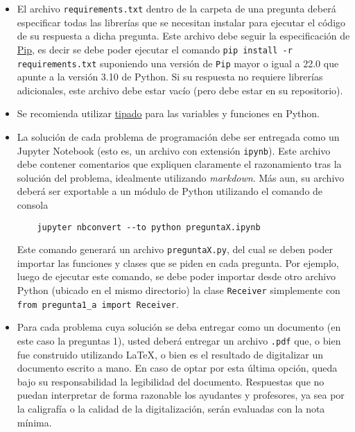 \begin{itemize}

  \item El archivo \texttt{requirements.txt} dentro de la carpeta de una pregunta deberá especificar todas las librerías que se necesitan instalar para ejecutar el código de su respuesta a dicha pregunta. Este archivo debe seguir la especificación de \href{https://pypi.org/project/pip/}{Pip}, es decir se debe poder ejecutar el comando \texttt{pip install -r requirements.txt} suponiendo una versión de \texttt{Pip} mayor o igual a 22.0 que apunte a la versión 3.10 de Python. Si su respuesta no requiere librerías adicionales, este archivo debe estar vacío (pero debe estar en su repositorio).

  \item Se recomienda utilizar \href{https://docs.python.org/3.10/library/typing.html}{tipado} para las variables y funciones en Python.

\item La solución de cada problema de programación debe ser entregada como un Jupyter Notebook (esto es, un archivo con extensión \texttt{ipynb}). Este archivo debe contener comentarios que expliquen claramente el razonamiento tras la solución del problema, idealmente utilizando \emph{markdown}. Más aun, su archivo deberá ser exportable a un módulo de Python utilizando el comando de consola
\begin{verbatim}
    jupyter nbconvert --to python preguntaX.ipynb
\end{verbatim}
Este comando generará un archivo \texttt{preguntaX.py}, del cual se deben poder importar las funciones y clases que se piden en cada pregunta. Por ejemplo, luego de ejecutar este comando, se debe poder importar desde otro archivo Python (ubicado en el mismo directorio) la clase \texttt{Receiver} simplemente con \texttt{from pregunta1\_a import Receiver}.

\item Para cada problema cuya solución se deba entregar como un documento (en este caso la preguntas 1), usted deberá entregar un archivo \texttt{.pdf} que, o bien fue construido utilizando \LaTeX, o bien es el resultado de digitalizar un documento escrito a mano. En caso de optar por esta última opción, queda bajo su responsabilidad la legibilidad del documento. Respuestas que no puedan interpretar de forma razonable los ayudantes y profesores, ya sea por la caligrafía o la calidad de la digitalización, serán evaluadas con la nota mínima.

\end{itemize}
